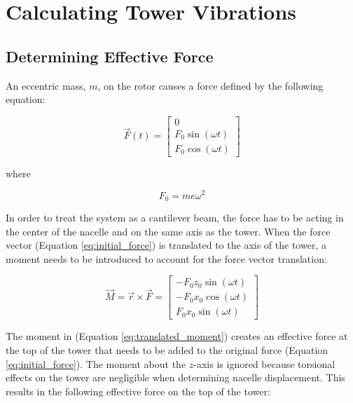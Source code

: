 \section{Calculating Tower Vibrations}

\subsection{Determining Effective Force}

An eccentric mass, $m$, on the rotor causes a force defined by the following equation:

\begin{equation} \label{eq:initial_force}
	\vec{F}(t) = 
		\begin{bmatrix}
			0 \\
			F_0\sin{(\omega t)} \\
			F_0\cos{(\omega t)}	
		\end{bmatrix}
\end{equation}

where

\begin{equation}
	F_0 = me\omega^2
\end{equation}

In order to treat the system as a cantilever beam, the force has to be acting in the center of the nacelle and on the same axis as the tower.  When the force vector (Equation \ref{eq:initial_force}) is translated to the axis of the tower, a moment needs to be introduced to account for the force vector translation:

\begin{equation} \label{eq:translated_moment}
	\vec{M} = \vec{r} \times \vec{F} = 
		\begin{bmatrix}
			- F_{0} z_{0} \sin{\left (\omega t \right )}\\
			- F_{0} x_{0} \cos{\left (\omega t \right )}\\
			F_{0} x_{0} \sin{\left (\omega t \right )}
		\end{bmatrix}
\end{equation}

The moment in (Equation \ref{eq:translated_moment}) creates an effective force at the top of the tower that needs to be added to the original force (Equation \ref{eq:initial_force}).  The moment about the $z$-axis is ignored because torsional effects on the tower are negligible when determining nacelle displacement.  This results in the following effective force on the top of the tower:

